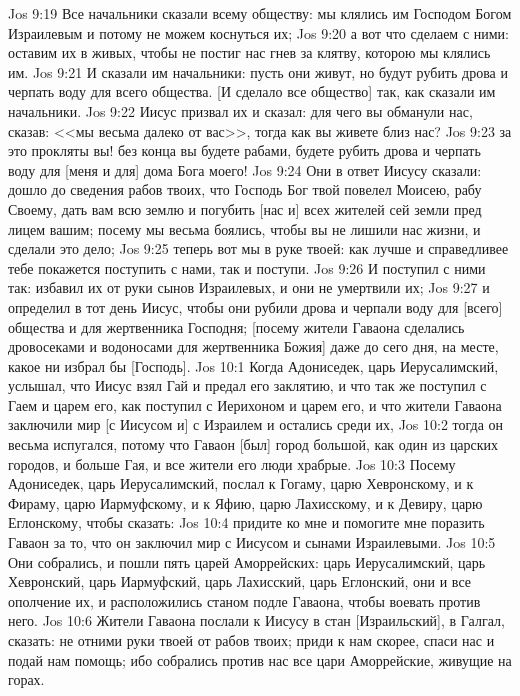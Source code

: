 \vs Jos 9:19 Все начальники сказали всему обществу: мы клялись им Господом Богом Израилевым и потому не можем коснуться их;
\vs Jos 9:20 а вот что сделаем с ними: оставим их в живых, чтобы не постиг нас гнев за клятву, которою мы клялись им.
\vs Jos 9:21 И сказали им начальники: пусть они живут, но будут рубить дрова и черпать воду для всего общества. [И сделало все общество] так, как сказали им начальники.
\vs Jos 9:22 Иисус призвал их и сказал: для чего вы обманули нас, сказав: <<мы весьма далеко от вас>>, тогда как вы живете близ нас?
\vs Jos 9:23 за это прокляты вы! без конца вы будете рабами, будете рубить дрова и черпать воду для [меня и для] дома Бога моего!
\vs Jos 9:24 Они в ответ Иисусу сказали: дошло до сведения рабов твоих, что Господь Бог твой повелел Моисею, рабу Своему, дать вам всю землю и погубить [нас и] всех жителей сей земли пред лицем вашим; посему мы весьма боялись, чтобы вы не лишили нас жизни, и сделали это дело;
\vs Jos 9:25 теперь вот мы в руке твоей: как лучше и справедливее тебе покажется поступить с нами, так и поступи.
\vs Jos 9:26 И поступил с ними так: избавил их от руки сынов Израилевых, и они не умертвили их;
\vs Jos 9:27 и определил в тот день Иисус, чтобы они рубили дрова и черпали воду для [всего] общества и для жертвенника Господня; [посему жители Гаваона сделались дровосеками и водоносами для жертвенника Божия] даже до сего дня, на месте, какое ни избрал бы [Господь].
\vs Jos 10:1 Когда Адониседек, царь Иерусалимский, услышал, что Иисус взял Гай и предал его заклятию, и что так же поступил с Гаем и царем его, как поступил с Иерихоном и царем его, и что жители Гаваона заключили мир [с Иисусом и] с Израилем и остались среди их,
\vs Jos 10:2 тогда он весьма испугался, потому что Гаваон [был] город большой, как один из царских городов, и больше Гая, и все жители его люди храбрые.
\vs Jos 10:3 Посему Адониседек, царь Иерусалимский, послал к Гогаму, царю Хевронскому, и к Фираму, царю Иармуфскому, и к Яфию, царю Лахисскому, и к Девиру, царю Еглонскому, чтобы сказать:
\vs Jos 10:4 придите ко мне и помогите мне поразить Гаваон за то, что он заключил мир с Иисусом и сынами Израилевыми.
\vs Jos 10:5 Они собрались, и пошли пять царей Аморрейских: царь Иерусалимский, царь Хевронский, царь Иармуфский, царь Лахисский, царь Еглонский, они и все ополчение их, и расположились станом подле Гаваона, чтобы воевать против него.
\vs Jos 10:6 Жители Гаваона послали к Иисусу в стан [Израильский], в Галгал, сказать: не отними руки твоей от рабов твоих; приди к нам скорее, спаси нас и подай нам помощь; ибо собрались против нас все цари Аморрейские, живущие на горах.
